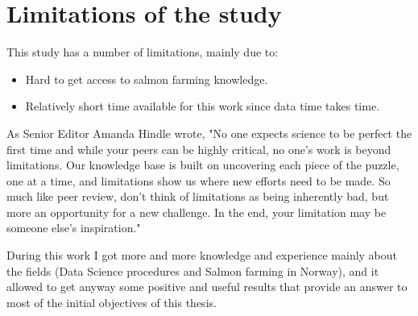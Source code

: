 \section{Limitations of the study}
\vspace{-5mm}
This study has a number of limitations, mainly due to:
\vspace{-5mm}
\begin{itemize}
 \setlength{\itemsep}{-5pt}
  \item Hard to get access to salmon farming knowledge.
  \item Relatively short time available for this work since data time takes time.
\end{itemize}

As Senior Editor Amanda Hindle wrote, "No one expects science to be perfect the first time and while your peers can be highly critical, no one’s work is beyond limitations. Our knowledge base is built on uncovering each piece of the puzzle, one at a time, and limitations show us where new efforts need to be made. So much like peer review, don’t think of limitations as being inherently bad, but more an opportunity for a new challenge. In the end, your limitation may be someone else’s inspiration." \cite{limitations}

During this work I got more and more knowledge and experience mainly about the fields (Data Science procedures and Salmon farming in Norway), and it allowed to get anyway some positive and useful results that provide an answer to most of the initial objectives of this thesis. \\
  
